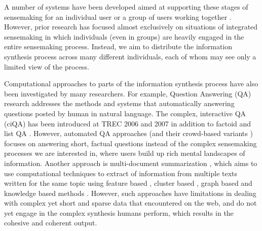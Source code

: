 A number of systems have been developed aimed at supporting these stages of sensemaking for an individual user \cite{baldonado1997sensemaker, dervin1992mind, dervin1998sense, Marchionini:2006:ESF:1121949.1121979, parameswaran2013datasift, law2011towards} or a group of users working together \cite{kittur2008harnessing, kittur2007he, morris2010wesearch, paul2009cosense, paul2010understanding,karl1995sensemaking}. However, prior research has focused almost exclusively on situations of integrated sensemaking in which individuals (even in groups) are heavily engaged in the entire sensemaking process. Instead, we aim to distribute the information synthesis process across many different individuals, each of whom may see only a limited view of the process.

Computational approaches to parts of the information synthesis process have also been investigated by many researchers. For example, Question Answering (QA) research addresses the methods and systems that automatically answering questions posted by human in natural language. The complex, interactive QA (ciQA) has been introduced at TREC 2006 and 2007 in addition to factoid and list QA \cite {dang2007overview}. However, automated QA approaches (and their crowd-based variants \cite{bernstein2012direct}) focuses on answering short, factual questions instead of the complex sensemaking processes we are interested in, where users build up rich mental landscapes of information.  Another approach is multi-document summarization \cite{barzilay1999information, goldstein2000multi, mani1997multi, mckeown1999towards}, which aims to use computational techniques to extract of information from multiple texts written for the same topic using feature based \cite{gupta2010survey}, cluster based \cite{jain1999data}, graph based \cite{erkan2004lexrank} and knowledge based methods \cite{hahn1999knowledge}. However, such approaches have limitations in dealing with complex yet short and sparse data that encountered on the web, and do not yet engage in the complex synthesis humans perform, which results in the cohesive and coherent output.


